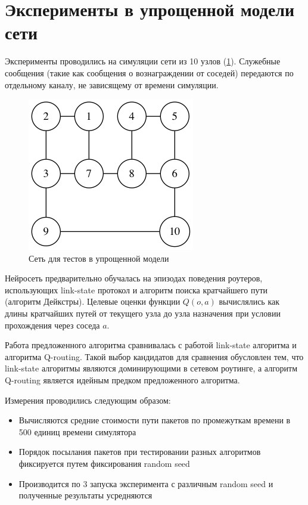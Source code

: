 \documentclass[specification, annotation]{itmo-student-thesis}
\begin{document}
\section{Эксперименты в упрощенной модели сети}\label{experiments:simple}

Эксперименты проводились на симуляции сети из 10 узлов
(\ref{fig-simple-network}). Служебные сообщения (такие как сообщения о
вознаграждении от соседей) передаются по отдельному каналу, не зависящему от
времени симуляции.

\begin{figure}[!h]
  \caption{Сеть для тестов в упрощенной модели}\label{fig-simple-network}
  \centering
  \includegraphics[scale=0.6]{graph-2.png}
\end{figure}

Нейросеть предварительно обучалась на эпизодах поведения роутеров, использующих
link-state протокол и алгоритм поиска кратчайшего пути (алгоритм Дейкстры).
Целевые оценки функции $Q(o, a)$ вычислялись как длины кратчайших путей от
текущего узла до узла назначения при условии прохождения через соседа $a$.

Работа предложенного алгоритма сравнивалась с работой link-state алгоритма и
алгоритма Q-routing. Такой выбор кандидатов для сравнения обусловлен тем, что
link-state алгоритмы являются доминирующими в сетевом роутинге, а алгоритм
Q-routing является идейным предком предложенного алгоритма.

Измерения проводились следующим образом:

\begin{itemize}
  \item Вычисляются средние стоимости пути пакетов по промежуткам времени в 500
    единиц времени симулятора
  \item Порядок посылания пакетов при тестировании разных алгоритмов фиксируется
    путем фиксирования random seed
  \item Производится по 3 запуска эксперимента с различным random seed и
    полученные результаты усредняются
\end{itemize}
\end{document}
